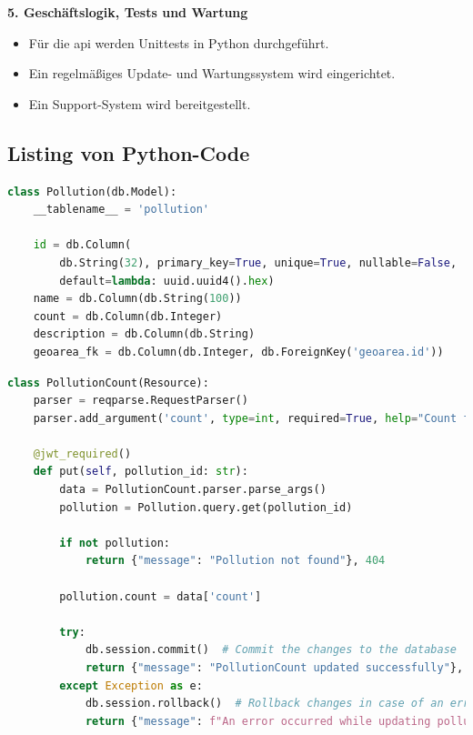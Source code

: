 \documentclass[a4paper,12pt]{article}
\begin{document}
\noindent\textbf{5. Geschäftslogik, Tests und Wartung}
\begin{itemize}
    \item Für die \gls{api} werden Unittests in Python durchgeführt.
    \item Ein regelmäßiges Update- und Wartungssystem wird eingerichtet.
    \item Ein Support-System wird bereitgestellt.
\end{itemize}

\clearpage
\subsection{Listing von Python-Code}
\label{sec:python-code}

\begin{lstlisting}[language=Python, caption=Implementation der Pollution-Klasse, label=lst:pollution]
class Pollution(db.Model):
    __tablename__ = 'pollution'

    id = db.Column(
        db.String(32), primary_key=True, unique=True, nullable=False,
        default=lambda: uuid.uuid4().hex)
    name = db.Column(db.String(100))
    count = db.Column(db.Integer)
    description = db.Column(db.String)
    geoarea_fk = db.Column(db.Integer, db.ForeignKey('geoarea.id'))
\end{lstlisting}

\begin{lstlisting}[language=Python, caption=Implementation der PollutionCount-Klasse, label=lst:pollutionCount]
class PollutionCount(Resource):
    parser = reqparse.RequestParser()
    parser.add_argument('count', type=int, required=True, help="Count field is required")

    @jwt_required()
    def put(self, pollution_id: str):
        data = PollutionCount.parser.parse_args()
        pollution = Pollution.query.get(pollution_id)

        if not pollution:
            return {"message": "Pollution not found"}, 404

        pollution.count = data['count']

        try:
            db.session.commit()  # Commit the changes to the database
            return {"message": "PollutionCount updated successfully"}, 200
        except Exception as e:
            db.session.rollback()  # Rollback changes in case of an error
            return {"message": f"An error occurred while updating pollution: {str(e)}"}, 500
\end{lstlisting}
\end{document}
